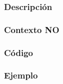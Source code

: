 \subsubsection{Descripci\'on} 
\subsubsection{Contexto NO}
\newpage 
\subsubsection{C\'odigo} 

\newpage
\subsubsection{Ejemplo} 